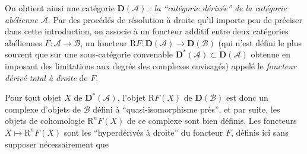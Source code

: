 On obtient ainsi une catégorie $\mathbf D(\mathcal A)$ :
\emph{la ``catégorie dérivée'' de la catégorie abélienne $\mathcal A$}.
Par des procédés de résolution à droite qu'il importe peu de préciser dans
cette introduction, on associe à un foncteur additif entre deux catégories
abéliennes $F:\mathcal A\to\mathcal B$, un foncteur
$\mathrm RF:\mathbf D(\mathcal A)\to\mathbf D(\mathcal B)$ (qui n'est défini
le plus souvent que sur une sous-catégorie convenable
$\mathbf D^*(\mathcal A)\subset\mathbf D(\mathcal A)$ obtenue en imposant des
limitations aux degrés des complexes envisagés) appelé le
\emph{foncteur dérivé total à droite} de $F$.

Pour tout objet $X$ de $\mathbf D^*(\mathcal A)$, l'objet $\mathrm RF(X)$ de
$\mathbf D(\mathcal B)$ est donc un complexe d'objets de $\mathcal B$ défini à
``quasi-isomorphisme près'', et par suite, les objets de cohomologie
$\mathrm R^nF(X)$ de ce complexe sont bien définis. Les foncteurs
$X\longmapsto\mathrm R^nF(X)$ sont les ``hyperdérivés à droite'' du foncteur
$F$, définis ici sans supposer nécessairement que
